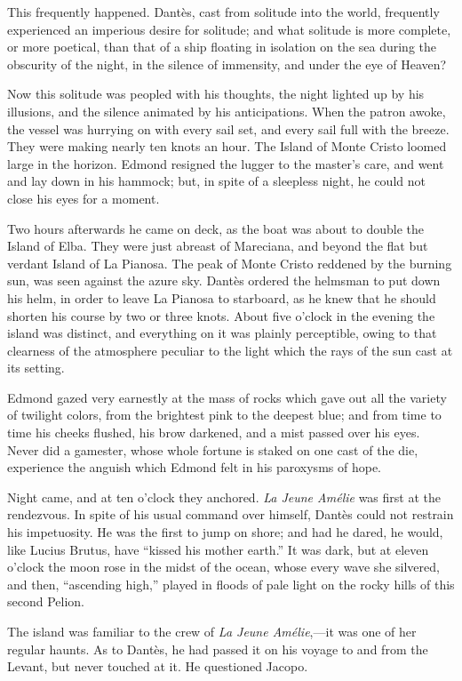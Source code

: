 This frequently happened. Dantès, cast from solitude into the world,
frequently experienced an imperious desire for solitude; and what
solitude is more complete, or more poetical, than that of a ship
floating in isolation on the sea during the obscurity of the night, in
the silence of immensity, and under the eye of Heaven?

Now this solitude was peopled with his thoughts, the night lighted up
by his illusions, and the silence animated by his anticipations. When
the patron awoke, the vessel was hurrying on with every sail set, and
every sail full with the breeze. They were making nearly ten knots an
hour. The Island of Monte Cristo loomed large in the horizon. Edmond
resigned the lugger to the master’s care, and went and lay down in his
hammock; but, in spite of a sleepless night, he could not close his
eyes for a moment.

Two hours afterwards he came on deck, as the boat was about to double
the Island of Elba. They were just abreast of Mareciana, and beyond the
flat but verdant Island of La Pianosa. The peak of Monte Cristo
reddened by the burning sun, was seen against the azure sky. Dantès
ordered the helmsman to put down his helm, in order to leave La Pianosa
to starboard, as he knew that he should shorten his course by two or
three knots. About five o’clock in the evening the island was distinct,
and everything on it was plainly perceptible, owing to that clearness
of the atmosphere peculiar to the light which the rays of the sun cast
at its setting.

Edmond gazed very earnestly at the mass of rocks which gave out all the
variety of twilight colors, from the brightest pink to the deepest
blue; and from time to time his cheeks flushed, his brow darkened, and
a mist passed over his eyes. Never did a gamester, whose whole fortune
is staked on one cast of the die, experience the anguish which Edmond
felt in his paroxysms of hope.

Night came, and at ten o’clock they anchored. \textit{La Jeune Amélie} was
first at the rendezvous. In spite of his usual command over himself,
Dantès could not restrain his impetuosity. He was the first to jump on
shore; and had he dared, he would, like Lucius Brutus, have “kissed his
mother earth.” It was dark, but at eleven o’clock the moon rose in the
midst of the ocean, whose every wave she silvered, and then, “ascending
high,” played in floods of pale light on the rocky hills of this second
Pelion.

The island was familiar to the crew of \textit{La Jeune Amélie},—it was one of
her regular haunts. As to Dantès, he had passed it on his voyage to and
from the Levant, but never touched at it. He questioned Jacopo.

